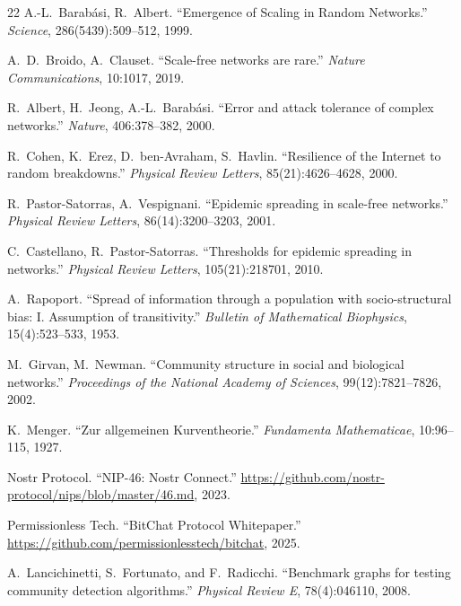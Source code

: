 \documentclass[11pt,a4paper]{article}
\begin{document}
\begin{thebibliography}{22}
A.-L.~Barab\'{a}si, R.~Albert.
\newblock ``Emergence of Scaling in Random Networks.''
\newblock \emph{Science}, 286(5439):509--512, 1999.

A.~D.~Broido, A.~Clauset.
\newblock ``Scale-free networks are rare.''
\newblock \emph{Nature Communications}, 10:1017, 2019.

R.~Albert, H.~Jeong, A.-L.~Barab\'{a}si.
\newblock ``Error and attack tolerance of complex networks.''
\newblock \emph{Nature}, 406:378--382, 2000.

R.~Cohen, K.~Erez, D.~ben-Avraham, S.~Havlin.
\newblock ``Resilience of the Internet to random breakdowns.''
\newblock \emph{Physical Review Letters}, 85(21):4626--4628, 2000.

R.~Pastor-Satorras, A.~Vespignani.
\newblock ``Epidemic spreading in scale-free networks.''
\newblock \emph{Physical Review Letters}, 86(14):3200--3203, 2001.

C.~Castellano, R.~Pastor-Satorras.
\newblock ``Thresholds for epidemic spreading in networks.''
\newblock \emph{Physical Review Letters}, 105(21):218701, 2010.

A.~Rapoport.
\newblock ``Spread of information through a population with socio-structural bias: I. Assumption of transitivity.''
\newblock \emph{Bulletin of Mathematical Biophysics}, 15(4):523--533, 1953.

M.~Girvan, M.~Newman.
\newblock ``Community structure in social and biological networks.''
\newblock \emph{Proceedings of the National Academy of Sciences}, 99(12):7821--7826, 2002.

K.~Menger.
\newblock ``Zur allgemeinen Kurventheorie.''
\newblock \emph{Fundamenta Mathematicae}, 10:96--115, 1927.

Nostr Protocol.
\newblock ``NIP-46: Nostr Connect.''
\newblock \url{https://github.com/nostr-protocol/nips/blob/master/46.md}, 2023.

Permissionless Tech.
\newblock ``BitChat Protocol Whitepaper.''
\newblock \url{https://github.com/permissionlesstech/bitchat}, 2025.

A.~Lancichinetti, S.~Fortunato, and F.~Radicchi.
\newblock ``Benchmark graphs for testing community detection algorithms.''
\newblock \emph{Physical Review E}, 78(4):046110, 2008.

\end{thebibliography}
\end{document}
